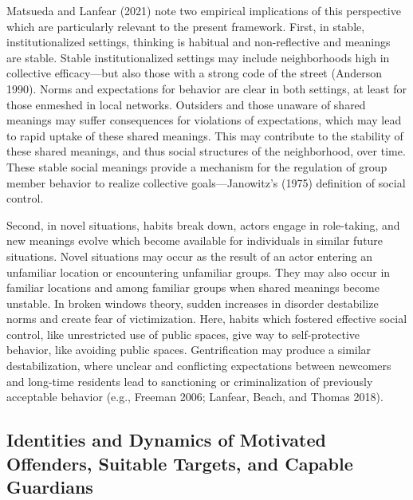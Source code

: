 \documentclass [11pt, proquest] {uwthesis}[2015/03/03]
\begin{document}
Matsueda and Lanfear (2021) note two empirical implications of this perspective which are particularly relevant to the present framework. First, in stable, institutionalized settings, thinking is habitual and non-reflective and meanings are stable. Stable institutionalized settings may include neighborhoods high in collective efficacy---but also those with a strong code of the street (Anderson 1990). Norms and expectations for behavior are clear in both settings, at least for those enmeshed in local networks. Outsiders and those unaware of shared meanings may suffer consequences for violations of expectations, which may lead to rapid uptake of these shared meanings. This may contribute to the stability of these shared meanings, and thus social structures of the neighborhood, over time. These stable social meanings provide a mechanism for the regulation of group member behavior to realize collective goals---Janowitz's (1975) definition of social control.

Second, in novel situations, habits break down, actors engage in role-taking, and new meanings evolve which become available for individuals in similar future situations. Novel situations may occur as the result of an actor entering an unfamiliar location or encountering unfamiliar groups. They may also occur in familiar locations and among familiar groups when shared meanings become unstable. In broken windows theory, sudden increases in disorder destabilize norms and create fear of victimization. Here, habits which fostered effective social control, like unrestricted use of public spaces, give way to self-protective behavior, like avoiding public spaces. Gentrification may produce a similar destabilization, where unclear and conflicting expectations between newcomers and long-time residents lead to sanctioning or criminalization of previously acceptable behavior (e.g., Freeman 2006; Lanfear, Beach, and Thomas 2018).

\hypertarget{identities-and-dynamics-of-motivated-offenders-suitable-targets-and-capable-guardians}{%
\subsection{Identities and Dynamics of Motivated Offenders, Suitable Targets, and Capable Guardians}\label{identities-and-dynamics-of-motivated-offenders-suitable-targets-and-capable-guardians}}
\end{document}
